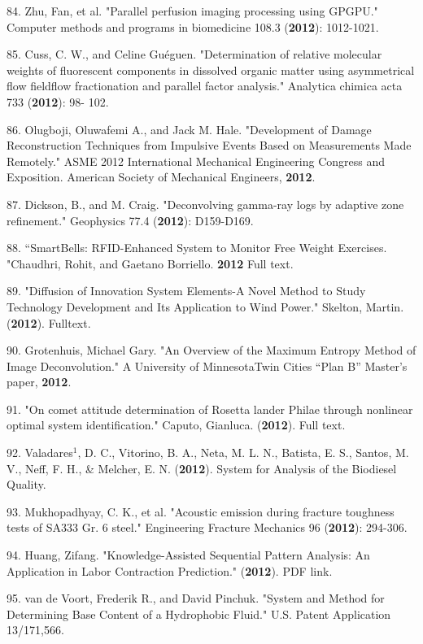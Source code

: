 84. Zhu, Fan, et al. "Parallel perfusion imaging processing using GPGPU." Computer methods and programs in biomedicine 108.3 (\textbf{2012}): 1012-1021.

85. Cuss, C. W., and Celine Gu\'{e}guen. "Determination of relative molecular weights of fluorescent components in dissolved organic matter using asymmetrical flow fieldflow fractionation and parallel factor analysis." Analytica chimica acta 733 (\textbf{2012}): 98- 102.

86. Olugboji, Oluwafemi A., and Jack M. Hale. "Development of Damage Reconstruction Techniques from Impulsive Events Based on Measurements Made Remotely." ASME 2012 International Mechanical Engineering Congress and Exposition. American Society of Mechanical Engineers, \textbf{2012}.

87. Dickson, B., and M. Craig. "Deconvolving gamma-ray logs by adaptive zone refinement." Geophysics 77.4 (\textbf{2012}): D159-D169.

88. ``SmartBells: RFID-Enhanced System to Monitor Free Weight Exercises. "Chaudhri, Rohit, and Gaetano Borriello. \textbf{2012} Full text.

89. "Diffusion of Innovation System Elements-A Novel Method to Study Technology Development and Its Application to Wind Power." Skelton, Martin. (\textbf{2012}). Fulltext.

90. Grotenhuis, Michael Gary. "An Overview of the Maximum Entropy Method of Image Deconvolution." A University of Minnesota\textendash{}Twin Cities ``Plan B'' Master’s paper, \textbf{2012}.

91. "On comet attitude determination of Rosetta lander Philae through nonlinear optimal system identification." Caputo, Gianluca. (\textbf{2012}). Full text.

92. Valadares$^{1}$, D. C., Vitorino, B. A., Neta, M. L. N., Batista, E. S., Santos, M. V., Neff, F. H., \& Melcher, E. N. (\textbf{2012}). System for Analysis of the Biodiesel Quality.

93. Mukhopadhyay, C. K., et al. "Acoustic emission during fracture toughness tests of SA333 Gr. 6 steel." Engineering Fracture Mechanics 96 (\textbf{2012}): 294-306.

94. Huang, Zifang. "Knowledge-Assisted Sequential Pattern Analysis: An Application in Labor Contraction Prediction." (\textbf{2012}). PDF link.

95. van de Voort, Frederik R., and David Pinchuk. "System and Method for Determining Base Content of a Hydrophobic Fluid." U.S. Patent Application 13/171,566.

